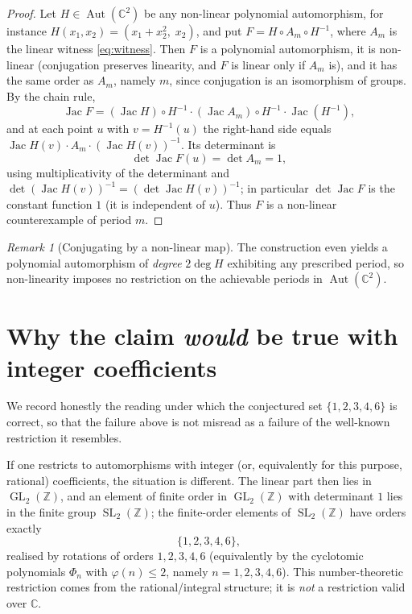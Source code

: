 \documentclass[11pt]{article}
\theoremstyle{remark}
\newtheorem{remark}[theorem]{Remark}
\newcommand{\Aut}{\operatorname{Aut}}
\newcommand{\GL}{\operatorname{GL}}
\newcommand{\SL}{\operatorname{SL}}
\newcommand{\Jac}{\operatorname{Jac}}
\newcommand{\C}{\mathbb{C}}
\newcommand{\Z}{\mathbb{Z}}
\begin{document}
\begin{proof}
Let $H\in\Aut(\C^2)$ be any non-linear polynomial automorphism, for instance
$H(x_1,x_2)=(x_1+x_2^2,\;x_2)$, and put $F=H\circ A_m\circ H^{-1}$, where $A_m$
is the linear witness \eqref{eq:witness}. Then $F$ is a polynomial
automorphism, it is non-linear (conjugation preserves linearity, and $F$ is
linear only if $A_m$ is), and it has the same order as $A_m$, namely $m$, since
conjugation is an isomorphism of groups. By the chain rule,
\[
  \Jac F = (\Jac H)\circ H^{-1}\cdot (\Jac A_m)\circ H^{-1}\cdot \Jac (H^{-1}),
\]
and at each point $u$ with $v=H^{-1}(u)$ the right-hand side equals
$\Jac H(v)\cdot A_m\cdot (\Jac H(v))^{-1}$. Its determinant is
\[
  \det \Jac F(u)=\det A_m=1,
\]
using multiplicativity of the determinant and
$\det(\Jac H(v))^{-1}=(\det \Jac H(v))^{-1}$; in particular $\det \Jac F$ is the
constant function $1$ (it is independent of $u$). Thus $F$ is a non-linear
counterexample of period $m$.
\end{proof}

\begin{remark}[Conjugating by a non-linear map]
The construction even yields a polynomial automorphism of \emph{degree}
$2\deg H$ exhibiting any prescribed period, so non-linearity imposes no
restriction on the achievable periods in $\Aut(\C^2)$.
\end{remark}

\section{Why the claim \emph{would} be true with integer coefficients}

We record honestly the reading under which the conjectured set
$\{1,2,3,4,6\}$ is correct, so that the failure above is not misread as a
failure of the well-known restriction it resembles.

If one restricts to automorphisms with integer (or, equivalently for this
purpose, rational) coefficients, the situation is different. The linear
part then lies in $\GL_2(\Z)$, and an element of finite order in $\GL_2(\Z)$
with determinant $1$ lies in the finite group $\SL_2(\Z)$; the finite-order
elements of $\SL_2(\Z)$ have orders exactly
\[
  \{1,2,3,4,6\},
\]
realised by rotations of orders $1,2,3,4,6$ (equivalently by the cyclotomic
polynomials $\Phi_n$ with $\varphi(n)\le 2$, namely $n=1,2,3,4,6$). This
number-theoretic restriction comes from the rational/integral structure; it is
\emph{not} a restriction valid over $\C$.
\end{document}
